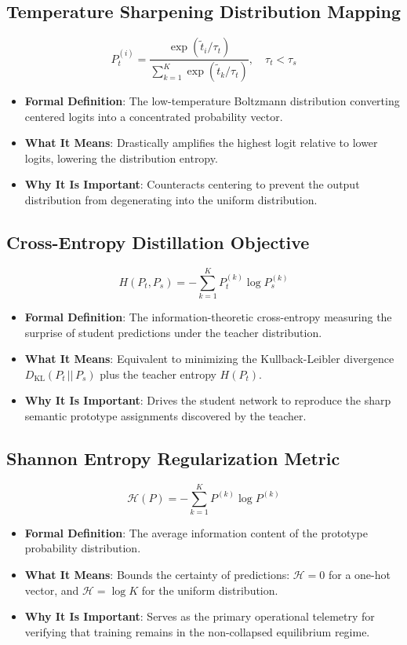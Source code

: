 \documentclass[11pt,a4paper]{article}
\theoremstyle{definition}
\begin{document}
\subsection{Temperature Sharpening Distribution Mapping}
{\boldmath
\begin{equation}
P_t^{(i)} = \frac{\exp(\tilde{t}_i / \tau_t)}{\sum_{k=1}^K \exp(\tilde{t}_k / \tau_t)}, \quad \tau_t < \tau_s
\end{equation}
}
\begin{itemize}
    \item \textbf{Formal Definition}: The low-temperature Boltzmann distribution converting centered logits into a concentrated probability vector.
    \item \textbf{What It Means}: Drastically amplifies the highest logit relative to lower logits, lowering the distribution entropy.
    \item \textbf{Why It Is Important}: Counteracts centering to prevent the output distribution from degenerating into the uniform distribution.
\end{itemize}

\subsection{Cross-Entropy Distillation Objective}
{\boldmath
\begin{equation}
H(P_t, P_s) = -\sum_{k=1}^K P_t^{(k)} \log P_s^{(k)}
\end{equation}
}
\begin{itemize}
    \item \textbf{Formal Definition}: The information-theoretic cross-entropy measuring the surprise of student predictions under the teacher distribution.
    \item \textbf{What It Means}: Equivalent to minimizing the Kullback-Leibler divergence $D_{\text{KL}}(P_t \,||\, P_s)$ plus the teacher entropy $H(P_t)$.
    \item \textbf{Why It Is Important}: Drives the student network to reproduce the sharp semantic prototype assignments discovered by the teacher.
\end{itemize}

\subsection{Shannon Entropy Regularization Metric}
{\boldmath
\begin{equation}
\mathcal{H}(P) = -\sum_{k=1}^K P^{(k)} \log P^{(k)}
\end{equation}
}
\begin{itemize}
    \item \textbf{Formal Definition}: The average information content of the prototype probability distribution.
    \item \textbf{What It Means}: Bounds the certainty of predictions: $\mathcal{H} = 0$ for a one-hot vector, and $\mathcal{H} = \log K$ for the uniform distribution.
    \item \textbf{Why It Is Important}: Serves as the primary operational telemetry for verifying that training remains in the non-collapsed equilibrium regime.
\end{itemize}
\end{document}

